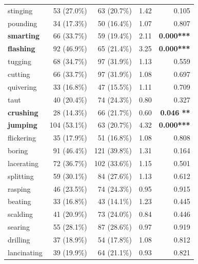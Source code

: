 \documentclass[preprint,12pt,authoryear]{elsarticle}
\begin{document}
\begin{table}[t!]
\begin{minipage}{0.49\textwidth}
{\begin{tabular}{lrrrr}
stinging & 53 (27.0\%) & 63 (20.7\%) & 1.42 & 0.105 \\
pounding & 34 (17.3\%) & 50 (16.4\%) & 1.07 & 0.807 \\
\textbf{smarting} & 66 (33.7\%) & 59 (19.4\%) & 2.11 & \textbf{0.000***} \\
\textbf{flashing} & 92 (46.9\%) & 65 (21.4\%) & 3.25 & \textbf{0.000***} \\
tugging & 68 (34.7\%) & 97 (31.9\%) & 1.13 & 0.559 \\
cutting & 66 (33.7\%) & 97 (31.9\%) & 1.08 & 0.697 \\
quivering & 33 (16.8\%) & 47 (15.5\%) & 1.11 & 0.709 \\
taut & 40 (20.4\%) & 74 (24.3\%) & 0.80 & 0.327 \\
\textbf{crushing} & 28 (14.3\%) & 66 (21.7\%) & 0.60 & \textbf{0.046 ** }\\
\textbf{jumping} & 104 (53.1\%) & 63 (20.7\%) & 4.32 & \textbf{0.000***} \\
flickering & 35 (17.9\%) & 51 (16.8\%) & 1.08 & 0.808 \\
boring & 91 (46.4\%) & 121 (39.8\%) & 1.31 & 0.164 \\
lacerating & 72 (36.7\%) & 102 (33.6\%) & 1.15 & 0.501 \\
splitting & 59 (30.1\%) & 84 (27.6\%) & 1.13 & 0.612 \\
rasping & 46 (23.5\%) & 74 (24.3\%) & 0.95 & 0.915 \\
beating & 33 (16.8\%) & 43 (14.1\%) & 1.23 & 0.445 \\
scalding & 41 (20.9\%) & 73 (24.0\%) & 0.84 & 0.446 \\
searing & 55 (28.1\%) & 87 (28.6\%) & 0.97 & 0.919 \\     
drilling & 37 (18.9\%) & 54 (17.8\%) & 1.08 & 0.812 \\
lancinating & 39 (19.9\%) & 64 (21.1\%) & 0.93 & 0.821 \\
\bottomrule
\end{tabular}
}
\end{minipage}
\hfill
\begin{minipage}{0.49\textwidth}
\centering
\renewcommand{\arraystretch}{1} 
\setlength{\tabcolsep}{1pt}
\footnotesize
{}
\end{minipage}
\end{table}
\end{document}
